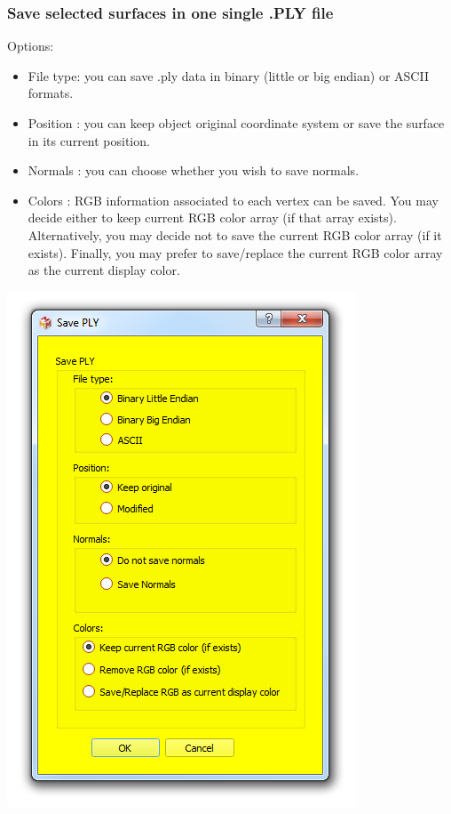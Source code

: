 \subsubsection{Save selected surfaces in one single .PLY file}

\begin{minipage}{0.5\textwidth}
Options:
\begin{itemize}
\item File type: you can save .ply data in binary (little or big endian)
or ASCII formats.
\item Position : you can keep object original coordinate system or
save the surface in its current position.
\item Normals : you can choose whether you wish to save normals.
\item Colors : RGB information associated to each vertex can be saved. You may decide either to keep current RGB color array (if that array exists). Alternatively, you may decide not to save the current RGB color array (if it exists). Finally, you may prefer to save/replace the current RGB color array as the current display color.
\end{itemize}

\end{minipage}    
\begin{minipage}{0.5\textwidth}\centering
  \includegraphics[scale=0.45]{images/07/surface/save_ply.png}
 \end{minipage} 

